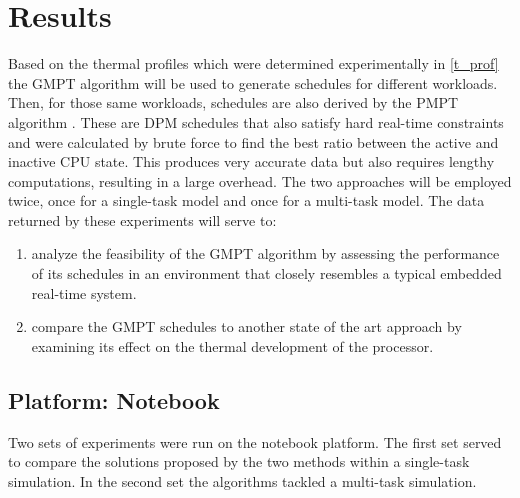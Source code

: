 
\chapter{Results}\label{chapter:results}
Based on the thermal profiles which were determined experimentally in \ref{t_prof} the GMPT algorithm will be used to generate schedules for different workloads. Then, for those same workloads, schedules are also derived by the PMPT algorithm \cite{Cheng2015}. These are DPM schedules that also satisfy hard real-time constraints and were calculated by brute force to find the best ratio between the active and inactive CPU state. This produces very accurate data but also requires lengthy computations, resulting in a large overhead. The two approaches will be employed twice, once for a single-task model and once for a multi-task model. The data returned by these experiments will serve to:
\begin{enumerate}[label=(\roman*)]
\item analyze the feasibility of the GMPT algorithm by assessing the performance of its schedules in an environment that closely resembles a typical embedded real-time system.
\item compare the GMPT schedules to another state of the art approach by examining its effect on the thermal development of the processor.
\end{enumerate}
\section{Platform: Notebook}
Two sets of experiments were run on the notebook platform. The first set served to compare the solutions proposed by the two methods within a single-task simulation. In the second set the algorithms tackled a multi-task simulation.
